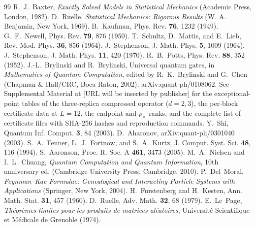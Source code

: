 \documentclass[aps,prx,reprint,superscriptaddress,nobibnotes,longbibliography]{revtex4-2}
\theoremstyle{remark}
\begin{document}
\begin{thebibliography}{99}
 R.~J.~Baxter, \emph{Exactly Solved Models in Statistical Mechanics} (Academic Press, London, 1982).
 D.~Ruelle, \emph{Statistical Mechanics: Rigorous Results} (W. A. Benjamin, New York, 1969).
 B.~Kaufman, Phys. Rev. \textbf{76}, 1232 (1949).
 G.~F.~Newell, Phys. Rev. \textbf{79}, 876 (1950).
 T.~Schultz, D.~Mattis, and E.~Lieb, Rev. Mod. Phys. \textbf{36}, 856 (1964).
 J.~Stephenson, J. Math. Phys. \textbf{5}, 1009 (1964).
 J.~Stephenson, J. Math. Phys. \textbf{11}, 420 (1970).
 R.~B.~Potts, Phys. Rev. \textbf{88}, 352 (1952).
 J.-L.~Brylinski and R.~Brylinski, Universal quantum gates, in \emph{Mathematics of Quantum Computation}, edited by R.~K.~Brylinski and G.~Chen (Chapman \& Hall/CRC, Boca Raton, 2002); arXiv:quant-ph/0108062.
 See Supplemental Material at [URL will be inserted by publisher] for the exceptional-point tables of the three-replica compressed operator ($d=2,3$), the per-block certificate data at $L=12$, the endpoint and $p_\times$ ranks, and the complete list of certificate files with SHA-256 hashes and reproduction commands.
 Y.~Shi, Quantum Inf. Comput. \textbf{3}, 84 (2003).
 D.~Aharonov, arXiv:quant-ph/0301040 (2003).
 S.~A.~Fenner, L.~J.~Fortnow, and S.~A.~Kurtz, J. Comput. Syst. Sci. \textbf{48}, 116 (1994).
 S.~Aaronson, Proc. R. Soc. A \textbf{461}, 3473 (2005).
 M.~A.~Nielsen and I.~L.~Chuang, \emph{Quantum Computation and Quantum Information}, 10th anniversary ed. (Cambridge University Press, Cambridge, 2010).
 P.~Del~Moral, \emph{Feynman--Kac Formulae: Genealogical and Interacting Particle Systems with Applications} (Springer, New York, 2004).
 H.~Furstenberg and H.~Kesten, Ann. Math. Stat. \textbf{31}, 457 (1960).
 D.~Ruelle, Adv. Math. \textbf{32}, 68 (1979).
E.~Le~Page, \emph{Th\'eor\`emes limites pour les produits de matrices al\'eatoires}, Universit\'e Scientifique et M\'edicale de Grenoble (1974).


\end{thebibliography}
\end{document}
